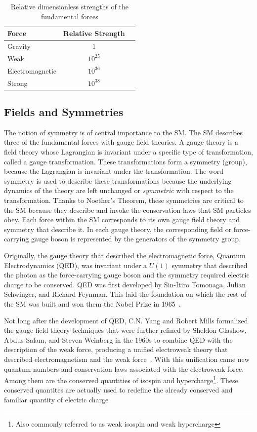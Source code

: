 \begin{table}[hbtp]
\centering
\caption[Relative strengths of the fundamental forces]{Relative dimensionless strengths of the fundamental forces}
\begin{tabular}{lcc}
\hline
Force & Relative Strength \\
\hline
Gravity & $1$ \\
Weak &  $10^{25}$ \\
Electromagnetic & $10^{36}$ \\
Strong & $10^{38}$ \\
\hline
\end{tabular}
\label{tab:force_table}
\end{table}


\subsection{Fields and Symmetries}
The notion of symmetry is of central importance to the SM.
The SM describes three of the fundamental forces with gauge field theories.
A gauge theory is a field theory whose Lagrangian is invariant under a specific type
of transformation, called a gauge transformation. These transformations form a symmetry (group), because the Lagrangian is invariant under the transformation.
The word symmetry is used to describe these transformations because
the underlying dynamics of the theory are left unchanged or \emph{symmetric} with respect to the transformation.
Thanks to Noether's Theorem, these symmetries are critical to the SM because they describe and invoke the conservation laws that SM particles obey.
Each force within the SM corresponds to its own gauge field theory
and symmetry that describe it. In each gauge theory, the corresponding field or force-carrying gauge boson is represented by the generators of the symmetry group. 

Originally, the gauge theory that described the electromagnetic force, Quantum Electrodynamics (QED), was invariant under a $U(1)$ symmetry that described the photon as the
force-carrying gauge boson and the symmetry required electric charge to be conserved. QED was first developed by Sin-Itiro Tomonaga, Julian Schwinger, and Richard Feynman.
This laid the foundation on which the rest of the SM was built and won them the Nobel Prize in 1965~\cite{NP65}. 

Not long after the development of QED, C.N. Yang and Robert Mills formalized the gauge field theory techniques that were further refined by Sheldon Glashow, Abdus Salam,
and Steven Weinberg in the 1960s to combine QED
with the description of the weak force, producing a unified electroweak theory that described electromagnetism and the weak force~\cite{NP79}.
With this unification came new quantum numbers and conservation laws associated with the electroweak force. Among them are the conserved quantities of isospin and hypercharge\footnote{Also commonly
referred to as weak isospin and weak hypercharge}. These conserved quantites are actually used to redefine the already conserved and familiar quantity of electric charge

